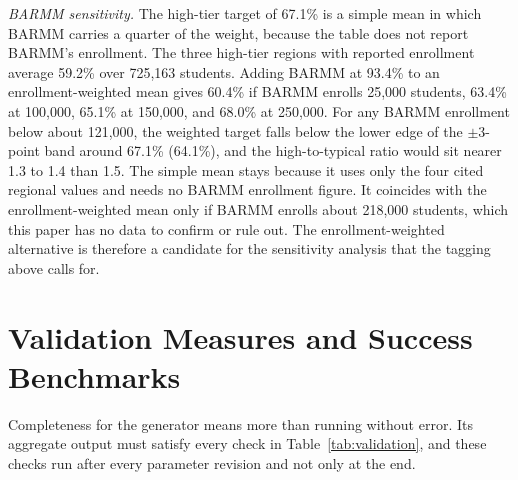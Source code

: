 \documentclass[11pt]{article}
\begin{document}
\emph{BARMM sensitivity.} The high-tier target of 67.1\% is a simple mean in which BARMM carries a quarter of the weight, because the table does not report BARMM's enrollment. The three high-tier regions with reported enrollment average 59.2\% over 725,163 students. Adding BARMM at 93.4\% to an enrollment-weighted mean gives 60.4\% if BARMM enrolls 25,000 students, 63.4\% at 100,000, 65.1\% at 150,000, and 68.0\% at 250,000. For any BARMM enrollment below about 121,000, the weighted target falls below the lower edge of the $\pm$3-point band around 67.1\% (64.1\%), and the high-to-typical ratio would sit nearer 1.3 to 1.4 than 1.5. The simple mean stays because it uses only the four cited regional values and needs no BARMM enrollment figure. It coincides with the enrollment-weighted mean only if BARMM enrolls about 218,000 students, which this paper has no data to confirm or rule out. The enrollment-weighted alternative is therefore a candidate for the sensitivity analysis that the tagging above calls for.

\FloatBarrier
\section{Validation Measures and Success Benchmarks}
\label{sec:validation}

\hspace*{\parindent}Completeness for the generator means more than running without error. Its aggregate output must satisfy every check in Table~\ref{tab:validation}, and these checks run after every parameter revision and not only at the end.
\end{document}
